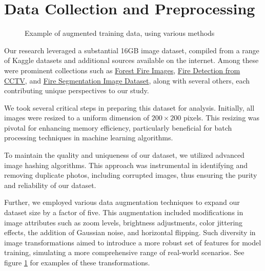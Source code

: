\section{Data Collection and Preprocessing}


\begin{figure}[htbp]
	\centering
	\qquad
	\qquad

	\qquad
	\qquad
	\caption{
		Example of augmented training data, using various methods
	}%
	\label{preprocessing}
\end{figure}

Our research leveraged a substantial 16GB image dataset, compiled from a range of Kaggle datasets and additional sources available on the internet. Among these were prominent collections such as \href{https://www.kaggle.com/datasets/mohnishsaiprasad/forest-fire-images}{Forest Fire Images}, \href{https://www.kaggle.com/datasets/ritupande/fire-detection-from-cctv}{Fire Detection from CCTV}, and \href{https://www.kaggle.com/datasets/diversisai/fire-segmentation-image-dataset}{Fire Segmentation Image Dataset}, along with several others, each contributing unique perspectives to our study.

We took several critical steps in preparing this dataset for analysis. Initially, all images were resized to a uniform dimension of \(200 \times 200\) pixels. This resizing was pivotal for enhancing memory efficiency, particularly beneficial for batch processing techniques in machine learning algorithms.

To maintain the quality and uniqueness of our dataset, we utilized advanced image hashing algorithms. This approach was instrumental in identifying and removing duplicate photos, including corrupted images, thus ensuring the purity and reliability of our dataset.

Further, we employed various data augmentation techniques to expand our dataset size by a factor of five. This augmentation included modifications in image attributes such as zoom levels, brightness adjustments, color jittering effects, the addition of Gaussian noise, and horizontal flipping. Such diversity in image transformations aimed to introduce a more robust set of features for model training, simulating a more comprehensive range of real-world scenarios. See figure \ref{preprocessing} for examples of these transformations.

